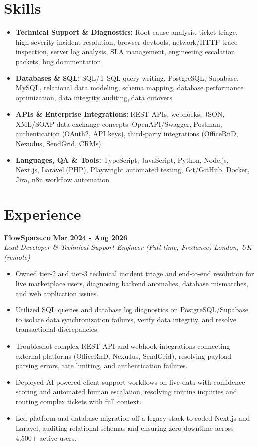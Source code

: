 \documentclass[a4paper,10pt]{article}
\newcommand{\role}[4]{%
  \textbf{#1} \hfill \textbf{#2}\\[1pt]%
  \textit{#3} \hfill \textit{#4}\\[2pt]%
}
\begin{document}
\section{Skills}
\begin{itemize}
  \item \textbf{Technical Support \& Diagnostics:} Root-cause analysis, ticket triage, high-severity incident resolution, browser devtools, network/HTTP trace inspection, server log analysis, SLA management, engineering escalation packets, bug documentation
  \item \textbf{Databases \& SQL:} SQL/T-SQL query writing, PostgreSQL, Supabase, MySQL, relational data modeling, schema mapping, database performance optimization, data integrity auditing, data cutovers
  \item \textbf{APIs \& Enterprise Integrations:} REST APIs, webhooks, JSON, XML/SOAP data exchange concepts, OpenAPI/Swagger, Postman, authentication (OAuth2, API keys), third-party integrations (OfficeRnD, Nexudus, SendGrid, CRMs)
  \item \textbf{Languages, QA \& Tools:} TypeScript, JavaScript, Python, Node.js, Next.js, Laravel (PHP), Playwright automated testing, Git/GitHub, Docker, Jira, n8n workflow automation
\end{itemize}

\section{Experience}

\role{\href{https://flowspace.co}{FlowSpace.co}}{Mar 2024 - Aug 2026}{Lead Developer \& Technical Support Engineer (Full-time, Freelance)}{London, UK (remote)}
\begin{itemize}
  \item Owned tier-2 and tier-3 technical incident triage and end-to-end resolution for live marketplace users, diagnosing backend anomalies, database mismatches, and web application issues.
  \item Utilized SQL queries and database log diagnostics on PostgreSQL/Supabase to isolate data synchronization failures, verify data integrity, and resolve transactional discrepancies.
  \item Troubleshot complex REST API and webhook integrations connecting external platforms (OfficeRnD, Nexudus, SendGrid), resolving payload parsing errors, rate limiting, and authentication failures.
  \item Deployed AI-powered client support workflows on live data with confidence scoring and automated human escalation, resolving routine inquiries and routing complex tickets with full context.
  \item Led platform and database migration off a legacy stack to coded Next.js and Laravel, auditing relational schemas and ensuring zero downtime across 4,500+ active users.
\end{itemize}
\end{document}
